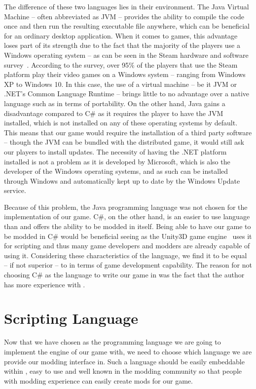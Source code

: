 The difference of these two languages lies in their environment. The Java Virtual Machine -- often abbreviated as JVM -- provides
the ability to compile the code once and then run the resulting executable file anywhere, which can be beneficial for an ordinary
desktop application. When it comes to games, this advantage loses part of its strength due to the fact that the majority of the
players use a Windows operating system -- as can be seen in the Steam hardware and software survey~\cite{SteamHW}. According
to the survey, over 95\% of the players that use the Steam platform  play their video games on a Windows system -- ranging
from Windows XP to Windows 10. In this case, the use of a virtual machine -- be it JVM or .NET's Common Language Runtime -- brings
little to no advantage over a native language such as \cpp in terms of portability. On the other hand, Java gains a disadvantage
compared to C\# as it requires the player to have the JVM installed, which is not installed on any of these operating systems
by default. This means that our game would require the installation of a third party software -- though the JVM can be bundled
with the distributed game, it would still ask our players to install updates. The necessity of having the .NET platform
installed is not a problem as it is developed by Microsoft,
which is also the developer of the Windows operating systems, and as such can be installed through Windows and automatically kept
up to date by the Windows Update service.

Because of this problem, the Java programming language was not chosen for the implementation of our game. C\#, on the other hand,
is an easier to use language than \cpp and offers the ability to be modded in itself. Being able to have our game to be modded
in C\# would be beneficial seeing as the Unity3D game engine~\cite{Unity} uses it for scripting and thus many game developers
and modders are already capable of using it. Considering these characteristics of the language, we find it to be equal -- if not
superior -- to \cpp in terms of game development capability. The reason for not choosing C\# as the language to write our game in
was the fact that the author has more experience with \cpp.

\section{Scripting Language}

Now that we have chosen \cpp as the programming language we are going to implement the engine of our game with, we need
to choose which language we are provide our modding interface in. Such a language should be easily embeddable within \cpp,
easy to use and well known in the modding community so that people with modding experience can easily create mods for our game.

